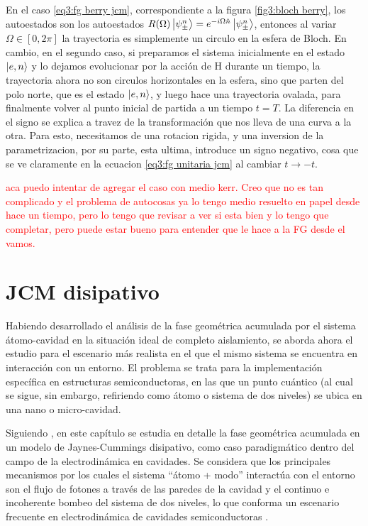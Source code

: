 En el caso \ref{eq3:fg berry jcm}, correspondiente a la figura \ref{fig3:bloch berry}, los autoestados son los autoestados $R(\Omega)\ket{\psi_\pm^n}=e^{-i\Omega \hat n}\ket{\psi_\pm^n}$, entonces al variar $\Omega\in [0,2\pi]$ la trayectoria es simplemente un circulo en la esfera de Bloch. En cambio, en el segundo caso, si preparamos el sistema inicialmente en el estado $\ket{e,n}$ y lo dejamos evolucionar por la acción de H durante un tiempo, la trayectoria ahora no son circulos horizontales en la esfera, sino que parten del polo norte, que es el estado $\ket{e,n}$, y luego hace una trayectoria ovalada, para finalmente volver al punto inicial de partida a un tiempo $t=T$. La diferencia en el signo se explica a travez de la transformación que nos lleva de una curva a la otra. Para esto, necesitamos de una rotacion rigida, y una inversion de la parametrizacion, por su parte, esta ultima, introduce un signo negativo, cosa que se ve claramente en la ecuacion \ref{eq3:fg unitaria jcm} al cambiar $t\rightarrow -t$.

\textcolor{red}{aca puedo intentar de agregar el caso con medio kerr. Creo que no es tan complicado y el problema de autocosas ya lo tengo medio resuelto en papel desde hace un tiempo, pero lo tengo que revisar a ver si esta bien y lo tengo que completar, pero puede estar bueno para entender que le hace a la FG desde el vamos.}

\section{JCM disipativo}


Habiendo desarrollado el análisis de la fase geométrica acumulada por el sistema átomo-cavidad en la situación ideal de completo aislamiento, se aborda ahora el estudio para el escenario más realista en el que el mismo sistema se encuentra en interacción con un entorno. El problema se trata para la implementación específica en estructuras semiconductoras, en las que un punto cuántico (al cual se sigue, sin embargo, refiriendo como átomo o sistema de dos niveles) se ubica en una nano o micro-cavidad.

Siguiendo \cite{80}, en este capítulo se estudia en detalle la fase geométrica acumulada en un modelo de Jaynes-Cummings disipativo, como caso paradigmático dentro del campo de la electrodinámica en cavidades. Se considera que los principales mecanismos por los cuales el sistema “átomo + modo” interactúa con el entorno son el flujo de fotones a través de las paredes de la cavidad y el continuo e incoherente bombeo del sistema de dos niveles, lo que conforma un escenario frecuente en electrodinámica de cavidades semiconductoras \cite{81,82,83}. 

